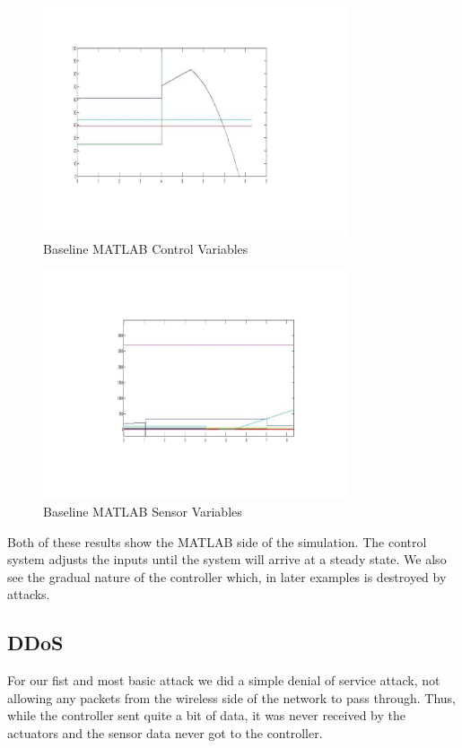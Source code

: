 \begin{figure}[ht!]
        \centering
		\includegraphics[width=90mm]{figs/Baselin_Matlab_control.png}
        \caption{Baseline MATLAB Control Variables}
        \label{fig:BaselineMATLABControl}        
\end{figure}

\begin{figure}[ht!]
        \centering
		\includegraphics[width=90mm]{figs/Baseline_Matlab_sensors.png}
        \caption{Baseline MATLAB Sensor Variables}
        \label{fig:BaselineMATLABSensors}        
\end{figure}

Both of these results show the MATLAB side of the simulation. The control system adjusts the inputs until the system will arrive at a steady state. We also see the gradual nature of the controller which, in later examples is destroyed by attacks. 

\subsection{DDoS}

For our fist and most basic attack we did a simple denial of service attack, not allowing any packets from the wireless side of the network to pass through. Thus, while the controller sent quite a bit of data, it was never received by the actuators and the sensor data never got to the controller. 

